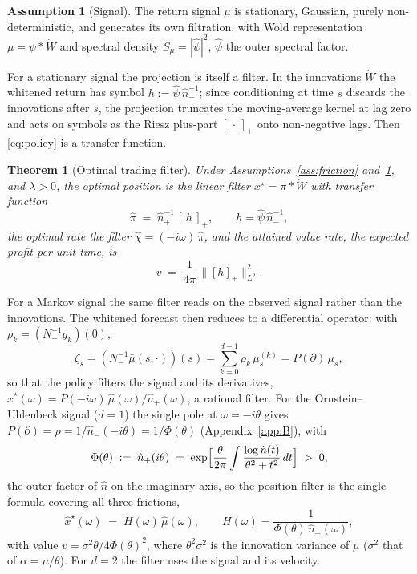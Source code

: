 \documentclass[11pt]{article}
\newcommand{\pluspart}[1]{\left[#1\right]_+}
\theoremstyle{plain}
\newtheorem{theorem}{Theorem}
\theoremstyle{definition}
\newtheorem{assumption}{Assumption}
\theoremstyle{remark}
\begin{document}
\begin{assumption}[Signal]\label{ass:signal}
The return signal $\mu$ is stationary, Gaussian, purely non-deterministic, and generates its own filtration, with Wold representation $\mu=\psi\ast\dot W$ and spectral density $S_\mu=|\hat\psi|^2$, $\hat\psi$ the outer spectral factor.
\end{assumption}

For a stationary signal the projection is itself a filter. In the innovations $\dot W$ the whitened return has symbol $h:=\hat\psi\,\hat n_-^{-1}$; since conditioning at time $s$ discards the innovations after $s$, the projection truncates the moving-average kernel at lag zero and acts on symbols as the Riesz plus-part $\pluspart{\,\cdot\,}$ onto non-negative lags. Then \eqref{eq:policy} is a transfer function.

\begin{theorem}[Optimal trading filter]\label{thm:filter}
Under Assumptions~\ref{ass:friction} and~\ref{ass:signal}, and $\lambda>0$, the optimal position is the linear filter $x^\star=\pi\ast\dot W$ with transfer function
\begin{equation}\label{eq:filter}
\hat\pi \;=\; \hat n_+^{-1}\,\pluspart{\,h\,},
\qquad h = \hat\psi\,\hat n_-^{-1},
\end{equation}
the optimal rate the filter $\hat\chi=(-i\omega)\,\hat\pi$, and the attained value rate, the expected profit per unit time, is
\begin{equation}\label{eq:value}
v \;=\; \frac{1}{4\pi}\,\bigl\|\pluspart{h}\bigr\|_{L^2}^2 .
\end{equation}
\end{theorem}

For a Markov signal the same filter reads on the observed signal rather than the innovations. The whitened forecast then reduces to a differential operator: with $\rho_k=(N_-^{-1}g_k)(0)$,
\begin{equation}\label{eq:zeta-collapse}
\zeta_s = (N_-^{-1}\bar\mu(s,\cdot))(s) = \sum_{k=0}^{d-1}\rho_k\,\mu^{(k)}_s = P(\partial)\,\mu_s,
\end{equation}
so that the policy filters the signal and its derivatives, $\hat x^\star(\omega)=P(-i\omega)\,\hat\mu(\omega)/\hat n_+(\omega)$, a rational filter. For the Ornstein--Uhlenbeck signal ($d=1$) the single pole at $\omega=-i\theta$ gives $P(\partial)=\rho=1/\hat n_-(-i\theta)=1/\Phi(\theta)$ (Appendix~\ref{app:B}), with
\begin{equation}\label{eq:phi}
\Phi(\theta) \;:=\; \hat n_+(i\theta) \;=\; \exp\Bigl[\frac{\theta}{2\pi}\int\frac{\log\hat n(t)}{\theta^2+t^2}\,dt\Bigr] \;>\;0,
\end{equation}
the outer factor of $\hat n$ on the imaginary axis, so the position filter is the single formula covering all three frictions,
\begin{equation}\label{eq:ou-filter}
\hat x^\star(\omega) \;=\; H(\omega)\,\hat\mu(\omega), \qquad H(\omega)=\frac{1}{\Phi(\theta)\,\hat n_+(\omega)},
\end{equation}
with value $v=\sigma^2\theta/4\Phi(\theta)^2$, where $\theta^2\sigma^2$ is the innovation variance of $\mu$ ($\sigma^2$ that of $\alpha=\mu/\theta$). For $d=2$ the filter uses the signal and its velocity.
\end{document}
